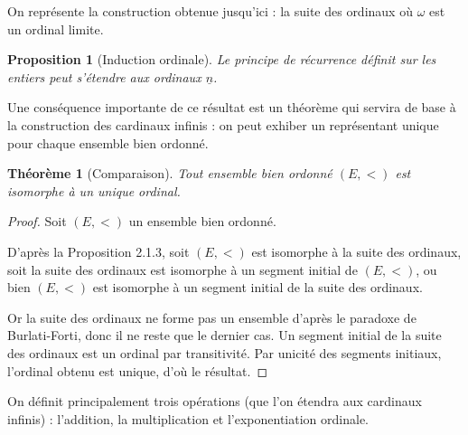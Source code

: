 \documentclass{article}
\theoremstyle{definition}
\theoremstyle{plain}
\newtheorem{proposition}[subsubsection]{Proposition}
\newtheorem{theorem}[subsubsection]{Théorème}
\theoremstyle{plain}
\theoremstyle{plain}
\theoremstyle{plain}
\theoremstyle{plain}
\begin{document}
\par On représente la construction obtenue jusqu'ici : la suite des ordinaux où \( \omega \) est un ordinal limite.
\begin{center}
\end{center}

\begin{proposition}[Induction ordinale]
	Le principe de récurrence définit sur les entiers peut s'étendre aux ordinaux \( \underline{n} \).
\end{proposition}

\par Une conséquence importante de ce résultat est un théorème qui servira de base à la construction des cardinaux infinis : on peut exhiber un représentant unique pour chaque ensemble bien ordonné.

\begin{theorem}[Comparaison]
	Tout ensemble bien ordonné \( (E,<) \) est isomorphe à un unique ordinal.
\end{theorem}
\begin{proof}
	Soit \( (E,<) \) un ensemble bien ordonné. 
	
	D'après la Proposition 2.1.3, soit \( (E,<) \) est isomorphe à la suite des ordinaux, soit la suite des ordinaux est isomorphe à un segment initial de \( (E,<) \), ou bien \( (E,<) \) est isomorphe à un segment initial de la suite des ordinaux.

	Or la suite des ordinaux ne forme pas un ensemble d'après le paradoxe de Burlati-Forti, donc il ne reste que le dernier cas. Un segment initial de la suite des ordinaux est un ordinal par transitivité. Par unicité des segments initiaux, l'ordinal obtenu est unique, d'où le résultat. 
\end{proof}

\par On définit principalement trois opérations (que l'on étendra aux cardinaux infinis) : l'addition, la multiplication et l'exponentiation ordinale. 
\end{document}

